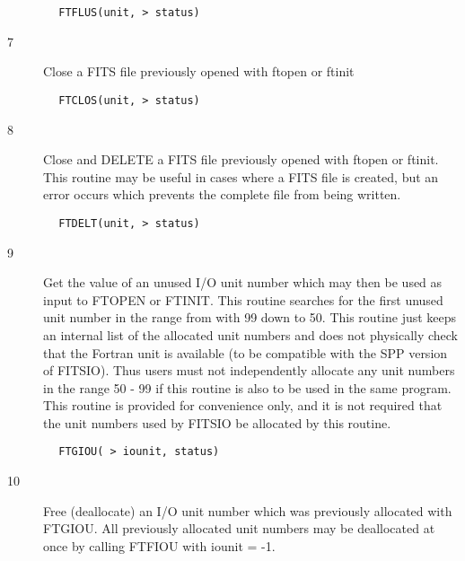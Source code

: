 \documentclass[11pt]{book}
\begin{document}
\begin{verbatim}
        FTFLUS(unit, > status)
\end{verbatim}

\begin{description}
\item[7 ]Close a FITS file previously opened with ftopen or ftinit
\end{description}

\begin{verbatim}
        FTCLOS(unit, > status)
\end{verbatim}

\begin{description}
\item[8 ] Close and DELETE a FITS file previously opened with ftopen or ftinit.
    This routine may be  useful in cases where a FITS file is created, but
   an error occurs which prevents the complete file from being written.
\end{description}

\begin{verbatim}
        FTDELT(unit, > status)
\end{verbatim}

\begin{description}
\item[9 ] Get the value of an unused I/O unit number which may then be used
    as input to FTOPEN or FTINIT.  This routine searches for the first
    unused unit number in the range from with 99 down to 50.   This
    routine just keeps an internal list of the allocated unit numbers
    and does not physically check that the Fortran unit is available (to be
    compatible with the SPP version of FITSIO).  Thus users must not
    independently allocate any unit numbers in the range 50 - 99
    if this routine is also to be used in the same program.  This
    routine is provided for convenience only, and it is not required
   that the unit numbers used by FITSIO be allocated by this routine.
\end{description}

\begin{verbatim}
        FTGIOU( > iounit, status)
\end{verbatim}

\begin{description}
\item[10]  Free (deallocate) an I/O unit number which was previously allocated
    with FTGIOU.   All previously allocated unit numbers may be
   deallocated at once by calling FTFIOU with iounit = -1.
\end{description}
\end{document}
